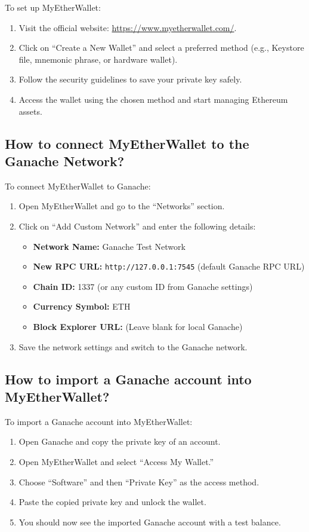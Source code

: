 \documentclass[11pt]{article}
\begin{document}
To set up MyEtherWallet:
\begin{enumerate}
    \item Visit the official website: \url{https://www.myetherwallet.com/}.
    \item Click on “Create a New Wallet” and select a preferred method (e.g., Keystore file, mnemonic phrase, or hardware wallet).
    \item Follow the security guidelines to save your private key safely.
    \item Access the wallet using the chosen method and start managing Ethereum assets.
\end{enumerate}

\subsection{How to connect MyEtherWallet to the Ganache Network?}

To connect MyEtherWallet to Ganache:
\begin{enumerate}
    \item Open MyEtherWallet and go to the “Networks” section.
    \item Click on “Add Custom Network” and enter the following details:
    \begin{itemize}
        \item \textbf{Network Name:} Ganache Test Network
        \item \textbf{New RPC URL:} \texttt{http://127.0.0.1:7545} (default Ganache RPC URL)
        \item \textbf{Chain ID:} 1337 (or any custom ID from Ganache settings)
        \item \textbf{Currency Symbol:} ETH
        \item \textbf{Block Explorer URL:} (Leave blank for local Ganache)
    \end{itemize}
    \item Save the network settings and switch to the Ganache network.
\end{enumerate}

\subsection{How to import a Ganache account into MyEtherWallet?}

To import a Ganache account into MyEtherWallet:
\begin{enumerate}
    \item Open Ganache and copy the private key of an account.
    \item Open MyEtherWallet and select “Access My Wallet.”
    \item Choose “Software” and then “Private Key” as the access method.
    \item Paste the copied private key and unlock the wallet.
    \item You should now see the imported Ganache account with a test balance.
\end{enumerate}
\end{document}
